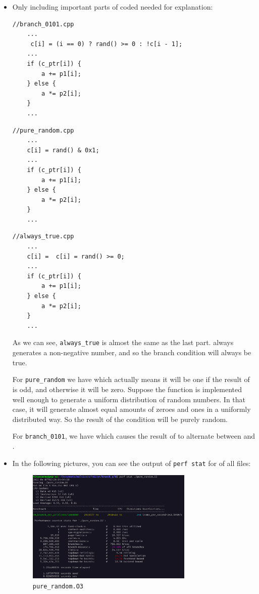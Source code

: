 \documentclass[12pt]{article}
\begin{document}
	\begin{itemize}
		\item 
		Only including important parts of coded needed for explanation:
		
		
\begin{lstlisting}[style=CStyle]
	//branch_0101.cpp
	...
	 c[i] = (i == 0) ? rand() >= 0 : !c[i - 1];
	...
	if (c_ptr[i]) {
		a += p1[i];
	} else {
		a *= p2[i];
	}
	...
\end{lstlisting}
	
		
\begin{lstlisting}[style=CStyle]
	//pure_random.cpp
	...
	c[i] = rand() & 0x1;
	...
	if (c_ptr[i]) {
		a += p1[i];
	} else {
		a *= p2[i];
	}
	...
\end{lstlisting}	

	
		
\begin{lstlisting}[style=CStyle]
	//always_true.cpp
	...
	c[i] =  c[i] = rand() >= 0;
	...
	if (c_ptr[i]) {
		a += p1[i];
	} else {
		a *= p2[i];
	}
	...
\end{lstlisting}	


As we can see, \Verb+always_true+ is almost the same as the last part.  always generates a non-negative number, and so the branch condition will always be true.

For \Verb+pure_random+ we have  which actually means it will be one if the result of  is odd, and otherwise it will be zero. Suppose the  function is implemented well enough to generate a uniform distribution of random numbers. In that case, it will generate almost equal amounts of zeroes and ones in a uniformly distributed way. So the result of the condition will be purely random.

For \Verb+branch_0101+, we have  which causes the result of  to alternate between  and .

\item
In the following pictures, you can see the output of \Verb+perf stat+ for of all files:

\begin{figure}[H]
	\centering
	\includegraphics[width=0.75\textwidth]{./images/4B/pure-random.png}	
	\cprotect\caption{\Verb+pure_random.O3+}
\end{figure}




\end{itemize}
\end{document}
